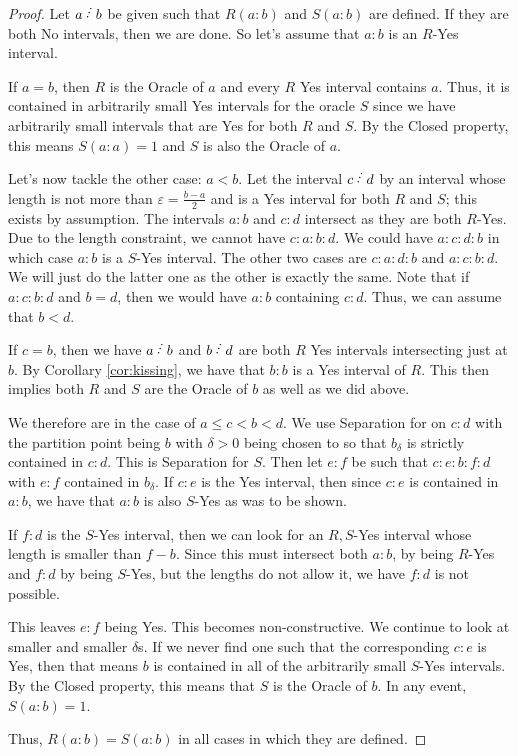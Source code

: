 \documentclass[12pt]{article}
\begin{document}
\begin{proof}
Let $a \lte b$ be given such that $R(a:b)$ and $S(a:b)$ are defined. If they are both No intervals, then we are done. So let’s assume that $a:b$ is an $R$-Yes interval. 

If $a=b$, then $R$ is the Oracle of $a$ and every $R$ Yes interval contains $a$. Thus, it is contained in arbitrarily small Yes intervals for the oracle $S$ since we have arbitrarily small intervals that are Yes for both $R$ and $S$. By the Closed property, this means $S(a:a)=1$ and $S$ is also the Oracle of $a$. 

Let’s now tackle the other case: $a<b$. Let the interval $c\lte d$ by an interval whose length is not more than $\varepsilon = \frac{b-a}{2}$ and is a Yes interval for both $R$ and $S$; this exists by assumption. The intervals $a:b$ and $c:d$ intersect as they are both $R$-Yes. Due to the length constraint, we cannot have $c:a:b:d$. We could have $a:c:d:b$ in which case $a:b$ is a $S$-Yes interval. The other two cases are $c:a:d:b$ and $a:c:b:d$. We will just do the latter one as the other is exactly the same. Note that if $a:c:b:d$ and $b=d$, then we would have $a:b$ containing $c:d$. Thus, we can assume that $b < d$.

If $c=b$, then we have $a\lte b$ and $b \lte d$ are both $R$ Yes intervals intersecting just at $b$. By Corollary \ref{cor:kissing}, we have that $b:b$ is a Yes interval of $R$. This then implies both $R$ and $S$ are the Oracle of $b$ as well as we did above.

We therefore are in the case of $a \leq c < b < d$. We use Separation for on $c:d$ with the partition point being $b$ with $\delta > 0$ being chosen to so that $b_{\delta}$ is strictly contained in $c:d$. This is Separation for $S$. Then let $e:f$ be such that $c:e:b:f:d$ with $e:f$ contained in $b_{\delta}$. If $c:e$ is the Yes interval, then since $c:e$ is contained in $a:b$, we have that $a:b$ is also $S$-Yes as was to be shown. 

If $f:d$ is the $S$-Yes interval, then we can look for an $R,S$-Yes interval whose length is smaller than $f-b$. Since this must intersect both $a:b$, by being $R$-Yes and $f:d$ by being $S$-Yes, but the lengths do not allow it, we have $f:d$ is not possible. 

This leaves $e:f$ being Yes. This becomes non-constructive. We continue to look at smaller and smaller $\delta$s. If we never find one such that the corresponding $c:e$ is Yes, then that means $b$ is contained in all of the arbitrarily small $S$-Yes intervals. By the Closed property, this means that $S$ is the Oracle of $b$. In any event, $S(a:b) = 1$.  

Thus, $R(a:b) = S(a:b)$ in all cases in which they are defined.
\end{proof} 
\end{document}
